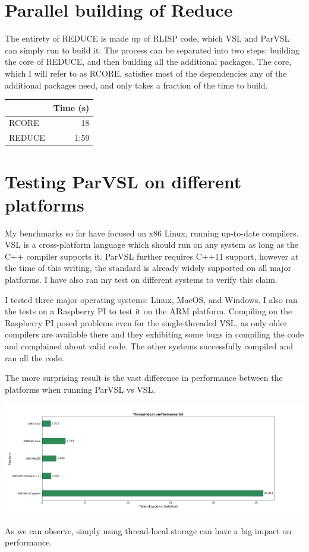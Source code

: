 \section{Parallel building of Reduce}

The entirety of REDUCE is made up of RLISP code, which VSL and ParVSL
can simply run to build it. The process can be separated into two steps:
building the core of REDUCE, and then building all the additional packages.
The core, which I will refer to as RCORE, satisfies most of the dependencies
any of the additional packages need, and only takes a fraction of the time
to build.

\begin{center}
\begin{tabular}{lr}
 & Time (s)\\
\hline
RCORE & 18\\
REDUCE & 1:59\\
\end{tabular}
\end{center}
\section{Testing ParVSL on different platforms}

My benchmarks so far have focused on x86 Linux, running
up-to-date compilers. VSL is a cross-platform language which should run on any system as long as the
C++ compiler supports it. ParVSL further requires C++11 support, however at the
time of this writing, the standard is already widely supported on all major platforms.
I have also ran my test on different systems to verify this claim.

I tested three major operating systems: Linux, MacOS, and Windows. I also
ran the tests on a Raspberry PI to test it on the ARM platform. Compiling on the Raspberry PI
posed problems even for the single-threaded VSL, as only older compilers are available
there and they exhibiting some bugs in compiling the code and complained about valid code.
The other systems successfully compiled and ran all the code.

The more surprising result is the vast difference in performance between the platforms
when running ParVSL vs VSL.


\begin{center}
\includegraphics[width=.9\linewidth]{thread_local.png}
\end{center}


As we can observe, simply using thread-local storage can have a big impact on performance.